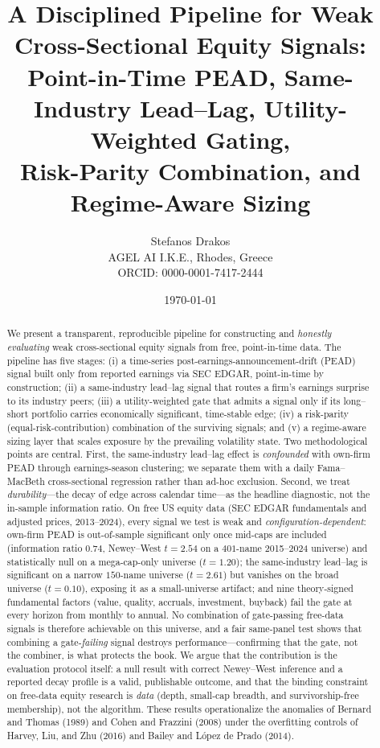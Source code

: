 \documentclass[11pt,a4paper]{article}
\title{\textbf{A Disciplined Pipeline for Weak Cross-Sectional Equity Signals:\\
Point-in-Time PEAD, Same-Industry Lead--Lag, Utility-Weighted Gating,\\
Risk-Parity Combination, and Regime-Aware Sizing}}
\author{Stefanos Drakos\\
\small AGEL AI I.K.E., Rhodes, Greece\\
\small ORCID: 0000-0001-7417-2444}
\date{\today}
\theoremstyle{plain}
\theoremstyle{definition}
\begin{document}
\maketitle

\begin{abstract}
We present a transparent, reproducible pipeline for constructing and \emph{honestly evaluating}
weak cross-sectional equity signals from free, point-in-time data. The pipeline has five stages:
(i) a time-series post-earnings-announcement-drift (PEAD) signal built only from reported earnings
via SEC EDGAR, point-in-time by construction; (ii) a same-industry lead--lag signal that routes a
firm's earnings surprise to its industry peers; (iii) a utility-weighted gate that admits a signal
only if its long--short portfolio carries economically significant, time-stable edge; (iv) a
risk-parity (equal-risk-contribution) combination of the surviving signals; and (v) a
regime-aware sizing layer that scales exposure by the prevailing volatility state. Two
methodological points are central. First, the same-industry lead--lag effect is \emph{confounded}
with own-firm PEAD through earnings-season clustering; we separate them with a daily
Fama--MacBeth cross-sectional regression rather than ad-hoc exclusion. Second, we treat
\emph{durability}---the decay of edge across calendar time---as the headline diagnostic, not the
in-sample information ratio. On free US equity data (SEC EDGAR fundamentals and adjusted prices,
2013--2024), every signal we test is weak and \emph{configuration-dependent}: own-firm PEAD is
out-of-sample significant only once mid-caps are included (information ratio $0.74$, Newey--West
$t=2.54$ on a $401$-name 2015--2024 universe) and statistically null on a mega-cap-only universe
($t=1.20$); the same-industry lead--lag is significant on a narrow $150$-name universe ($t=2.61$)
but vanishes on the broad universe ($t=0.10$), exposing it as a small-universe artifact; and nine
theory-signed fundamental factors (value, quality, accruals, investment, buyback) fail the gate at
every horizon from monthly to annual. No combination of gate-passing free-data signals is therefore
achievable on this universe, and a fair same-panel test shows that combining a gate-\emph{failing}
signal destroys performance---confirming that the gate, not the combiner, is what protects the book.
We argue that the contribution is the evaluation protocol itself: a null result with correct
Newey--West inference and a reported decay profile is a valid, publishable outcome, and that the
binding constraint on free-data equity research is \emph{data} (depth, small-cap breadth, and
survivorship-free membership), not the algorithm. These results operationalize the anomalies of Bernard and Thomas (1989) and
Cohen and Frazzini (2008) under the overfitting controls of Harvey, Liu, and Zhu (2016) and Bailey
and L\'opez de Prado (2014).
\end{abstract}
\end{document}
